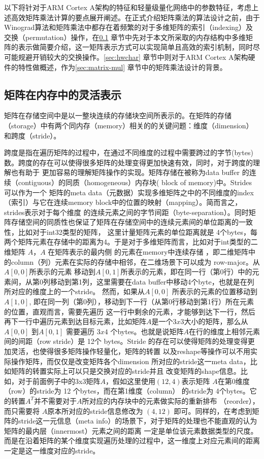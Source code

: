 以下将针对于ARM Cortex A架构的特征和轻量级量化网络中的参数特征，考虑上述高效矩阵乘法计算的要点展开阐述。在正式介绍矩阵乘法的算法设计之前，由于Winograd算法和矩阵乘法中都存在着频繁的对于多维矩阵的索引（indexing）及交换（permutation）操作，在\ref{sec:matrix_repr} 章节中先对于本文所采取的内存结构中多维矩阵的表示做简要介绍，这一矩阵表示方式可以实现简单且高效的索引机制，同时尽可能规避开销较大的交换操作。\ref{sec:hwchar} 章节中则对于ARM Cortex A架构硬件的特性做概述，作为\ref{sec:matrix-mul} 章节中的矩阵乘法设计的背景。


\subsection{矩阵在内存中的灵活表示}
\label{sec:matrix_repr}
矩阵在存储空间中是以一整块连续的存储块空间所表示的。在矩阵的存储（storage）中有两个同内存（memory）相关的的关键问题：维度（dimension）和跨度（stride）。

跨度是指在遍历矩阵的过程中，在通过不同维度的过程中需要跨过的字节(bytes)数。跨度的存在可以使得很多矩阵的处理变得更加快速有效，同时，对于跨度的理解也有助于
更加容易的理解矩阵操作的实现。矩阵存储在被称为data buffer 的连续（contiguous）的同质（homogeneous）内存块( block of memory)中。Strides 可以作为一个
矩阵的meta data（元数据）实现多维矩阵之中的不同维度的index（索引）与它在连续memory block中的位置的映射（mapping）。简而言之，strides表示对于每个维度
的连续元素之间的字节间距（byte-separation）。同时矩阵存储空间的同质性也保证了矩阵在存储空间中的连续元素间的单位距离的一致性，比如对于int32类型的矩阵，
这里计量矩阵元素的单位距离就是 4个bytes，每两个矩阵元素在存储中的距离为4。于是对于多维矩阵而言，比如对于int类型的二维矩阵 $A$，$A$ 在矩阵表示的最内侧
的元素在memory中连续存储 ，即二维矩阵中的column（列）元素在实际的存储中相邻，在二维场景下可以成为 row-major。从$A[0, 0]$所表示的元素
移动到$A[0,1]$所表示的元素，即在同一行（第0行）中的元素间，从第0列移动到第1列，这里需要在data buffer中移动4个byte，也就是在列所对应的维度上的一个stride。
然而，如果从$A[0,0]$ 所表示的元素的位置移动到 $A[1, 0]$, 即在同一列（第0列），移动到下一行（从第0行移动到第1行）所在元素的位置，直观而言，需要先遍历
这一行中剩余的元素，才能够到达下一行，然后再下一行中遍历元素到达目标元素，比如矩阵$A$是一个$3x3$大小的矩阵，那么从 $A[0,0]$ 到$A[0,1]$ 需要遍历
$3x4$ 个bytes。也就是说矩阵$A$在行的维度上相邻元素间的间距（row stride）是 12个 bytes。Stride 的存在可以使得矩阵的处理变得更加灵活，也使得很多矩阵操作轻量化，矩阵的转置
以及reshape等操作可以不用实际操作矩阵，而仅仅是改变矩阵各个dimension 所对应的stride这一meta data，比如矩阵的转置实际上可以只是交换对应的stride并且
改变矩阵的shape信息。比如，对于前面例子中的3x3矩阵$A$，假如这里使用$(12, 4)$表示矩阵 $A$在第0维度（row）的stride为 12 个bytes，而在第1维度（column）
的stride为 4个bytes。它的转置$A^T$并不需要对于$A$所对应的内存块中的元素做实际的重新排布 （reorder），而只需要将 $A$原本所对应的stride信息修改为
$(4, 12)$ 即可。同样的，在考虑到矩阵的stride这一元信息（meta info）的场景下，对于矩阵的处理也不能直观的认为矩阵的最内层（innermost）元素之间的距离
一定是单位该元素数据类型的尺度。而是在沿着矩阵的某个维度实现遍历处理的过程中，这一维度上对应元素间的距离一定是这一维度对应的stride。

